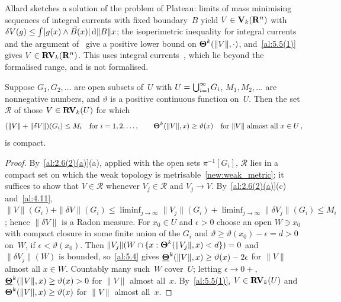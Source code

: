 \begin{remark}
    \label{al:5.5(3)}
    Allard sketches a solution of the problem of Plateau: limits of mass minimising sequences of
    integral currents with fixed boundary~$B$ yield $V \in \mathbf{V}_{k}(\mathbf{R}^{n})$ with $\delta
    V(g) \le {\textstyle\int_{}^{}} |g(x) \wedge \vec B(x)| \,\mathrm{d} \|B\| x$; the isoperimetric inequality for
    integral currents~\cite[4.2.10]{Federer1969} and the argument of~\cite[4.1.25]{Federer1969}
    give a positive lower bound on $\boldsymbol{\Theta}^{k}(\|V\|,\cdot)$, and~\ref{al:5.5(1)} gives $V \in
    \mathbf{RV}_{k}(\mathbf{R}^{n})$. This uses integral currents~\cite[4.2]{Federer1969}, which lie beyond
    the formalised range, and is not formalised.
\end{remark}

\begin{theorem}
    \label{al:5.6}
    Suppose $G_1, G_2, \ldots$ are open subsets of~$U$ with $U = {{\textstyle \bigcup}}_{i=1}^\infty G_i$, $M_1,
    M_2, \ldots$ are nonnegative numbers, and $\vartheta$ is a positive continuous function
    on~$U$. Then the set $\mathcal{R}$ of those $V \in \mathbf{RV}_{k}(U)$ for which
    \begin{displaymath}
        (\|V\| + \|\delta V\|)(G_i) \le M_i \quad \text{for $i = 1, 2, \ldots$} \,, \qquad
        \boldsymbol{\Theta}^{k}(\|V\|,x) \ge \vartheta(x) \quad \text{for $\|V\|$ almost all $x \in U$} \,,
    \end{displaymath}
    is compact.
\end{theorem}

\begin{proof}
    By~\ref{al:2.6(2)(a)}(a), applied with the open sets $\pi^{-1}[G_i]$, $\mathcal{R}$ lies in
    a compact set on which the weak topology is metrisable~\ref{new:weak_metric}; it suffices to
    show that $V \in \mathcal{R}$ whenever $V_j \in \mathcal{R}$ and $V_j \to V$. By~\ref{al:2.6(2)(a)}(c)
    and~\ref{al:4.11}, $\|V\|(G_i) + \|\delta V\|(G_i) \le \liminf_{j \to \infty} \|V_j\|(G_i) +
    \liminf_{j \to \infty} \|\delta V_j\|(G_i) \le M_i$; hence $\|\delta V\|$ is a Radon measure.
    For $x_0 \in U$ and $\epsilon > 0$ choose an open $W \ni x_0$ with compact closure in some
    finite union of the $G_i$ and $\vartheta \ge \vartheta(x_0) - \epsilon = d > 0$ on~$W$, if
    $\epsilon < \vartheta(x_0)$. Then $\|V_j\|(W \cap \{ x : \boldsymbol{\Theta}^{k}(\|V_j\|,x) < d \}) = 0$
    and $\|\delta V_j\|(W)$ is bounded, so~\ref{al:5.4} gives $\boldsymbol{\underline{\Theta}}^{k}(\|V\|,x) \ge
    \vartheta(x) - 2 \epsilon$ for $\|V\|$ almost all $x \in W$. Countably many such~$W$
    cover~$U$; letting $\epsilon \to 0+$, $\boldsymbol{\underline{\Theta}}^{k}(\|V\|,x) \ge \vartheta(x) > 0$ for
    $\|V\|$ almost all~$x$. By~\ref{al:5.5(1)}, $V \in \mathbf{RV}_{k}(U)$ and
    $\boldsymbol{\Theta}^{k}(\|V\|,x) \ge \vartheta(x)$ for $\|V\|$ almost all~$x$.
\end{proof}

